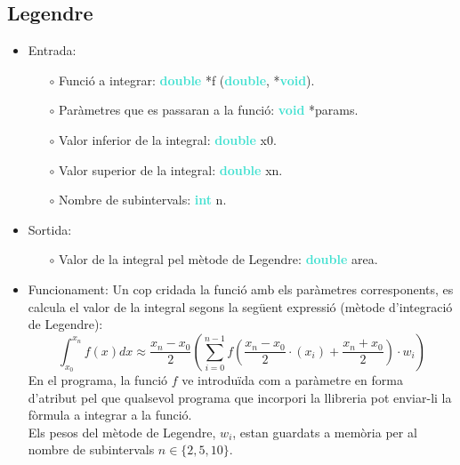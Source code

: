 \documentclass[12pt]{article}
\begin{document}
\subsection{Legendre}
\begin{itemize}
    \item Entrada:
    \begin{itemize}
        \item[$\circ$] Funció a integrar: \textbf{\textcolor{Turquoise}{double}} *f (\textbf{\textcolor{Turquoise}{double}},  *\textbf{\textcolor{Turquoise}{void}}).
        \item[$\circ$] Paràmetres que es passaran a la funció: \textbf{\textcolor{Turquoise}{void}} *params.
        \item[$\circ$] Valor inferior de la integral: \textbf{\textcolor{Turquoise}{double}} x0.
        \item[$\circ$] Valor superior de la integral: \textbf{\textcolor{Turquoise}{double}} xn.
        \item[$\circ$] Nombre de subintervals: \textbf{\textcolor{Turquoise}{int}} n.
    \end{itemize}
    \item Sortida:
        \begin{itemize}
            \item[$\circ$] Valor de la integral pel mètode de Legendre: \textbf{\textcolor{Turquoise}{double}} area.
        \end{itemize}
    \item Funcionament:
    Un cop cridada la funció amb els paràmetres corresponents, es calcula el valor de la integral segons la següent expressió (mètode d'integració de Legendre):
        \begin{equation*}
            \int_{x_0}^{x_n}f(x)dx \approx \frac{x_n-x_0}{2} \left( \sum_{i=0}^{n-1}f\left(\frac{x_n-x_0}{2}\cdot (x_i) + \frac{x_n+x_0}{2}\right)\cdot w_i\right)
        \end{equation*}
        En el programa, la funció $f$ ve introduïda com a paràmetre en forma d'atribut pel que qualsevol programa que incorpori la llibreria pot enviar-li la fòrmula a integrar a la funció.\\
        Els pesos del mètode de Legendre, $w_i$, estan guardats a memòria per al nombre de subintervals $n\in\{2,5,10\}$.

    
\end{itemize}
\newpage
\end{document}

